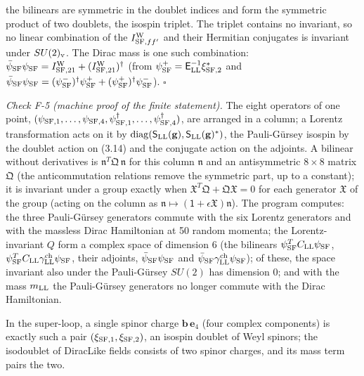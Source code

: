 \documentclass[
  10pt,
]{article}
\begin{document}
the bilinears are symmetric in the doublet indices and form the
symmetric product of two doublets, the isospin triplet. The triplet
contains no invariant, so no linear combination of the
\(I^{\rm W}_{{\rm SF},ff'}\) and their Hermitian conjugates is invariant
under \(SU(2)_{\rm v}\). The Dirac mass is one such combination:
\(\bar\psi_{\rm SF}\psi_{\rm SF}=I^{\rm W}_{{\rm SF},21}+(I^{\rm W}_{{\rm SF},21})^\dagger\)
(from \(\psi^+_{\rm SF}=\mathsf E_{\rm LL}^{-1}\xi_{{\rm SF},2}^*\) and
\(\bar\psi_{\rm SF}\psi_{\rm SF}=(\psi^-_{\rm SF})^\dagger\psi^+_{\rm SF}+(\psi^+_{\rm SF})^\dagger\psi^-_{\rm SF}\)).
\(\square\)

\emph{Check F-5 (machine proof of the finite statement).} The eight
operators of one point,
\((\psi_{{\rm SF},1},\dots,\psi_{{\rm SF},4},\psi^\dagger_{{\rm SF},1},\dots,\psi^\dagger_{{\rm SF},4})\),
are arranged in a column; a Lorentz transformation acts on it by
\(\mathrm{diag}(\mathsf S_{\rm LL}(\mathbf g),\mathsf S_{\rm LL}(\mathbf g)^*)\),
the Pauli-Gürsey isospin by the doublet action on (3.14) and the
conjugate action on the adjoints. A bilinear without derivatives is
\(\mathfrak n^T\mathfrak Q\,\mathfrak n\) for this column
\(\mathfrak n\) and an antisymmetric \(8\times8\) matrix \(\mathfrak Q\)
(the anticommutation relations remove the symmetric part, up to a
constant); it is invariant under a group exactly when
\(\mathfrak X^T\mathfrak Q+\mathfrak Q\mathfrak X=0\) for each generator
\(\mathfrak X\) of the group (acting on the column as
\(\mathfrak n\mapsto(\mathsf 1+\epsilon\mathfrak X)\mathfrak n\)). The
program computes: the three Pauli-Gürsey generators commute with the six
Lorentz generators and with the massless Dirac Hamiltonian at 50 random
momenta; the Lorentz-invariant \(Q\) form a complex space of dimension 6
(the bilinears \(\psi^T_{\rm SF}C_{\rm LL}\psi_{\rm SF}\),
\(\psi^T_{\rm SF}C_{\rm LL}\gamma^{\rm ch}_{\rm LL}\psi_{\rm SF}\),
their adjoints, \(\bar\psi_{\rm SF}\psi_{\rm SF}\) and
\(\bar\psi_{\rm SF}\gamma^{\rm ch}_{\rm LL}\psi_{\rm SF}\)); of these,
the space invariant also under the Pauli-Gürsey \(SU(2)\) has dimension
0; and with the mass \(m_{\rm LL}\) the Pauli-Gürsey generators no
longer commute with the Dirac Hamiltonian.

In the super-loop, a single spinor charge \(\mathbf b\,\mathbf e_4\)
(four complex components) is exactly such a pair
\((\xi_{{\rm SF},1},\xi_{{\rm SF},2})\), an isospin doublet of Weyl
spinors; the isodoublet of DiracLike fields consists of two spinor
charges, and its mass term pairs the two.
\end{document}

